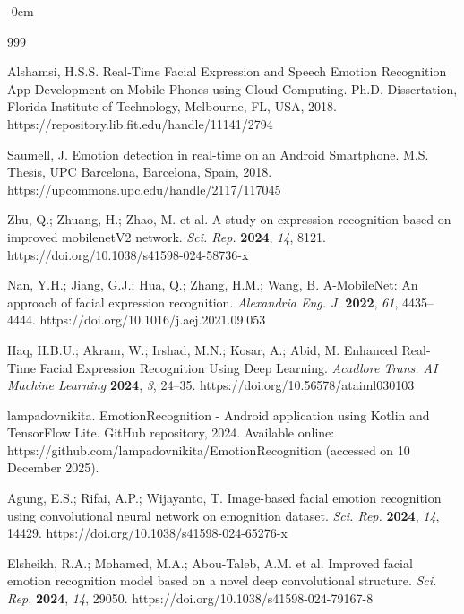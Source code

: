 \documentclass[journal,article,submit,pdftex,moreauthors]{Definitions/mdpi}
\begin{document}
\begin{adjustwidth}{-\extralength}{0cm}
	
	
	\begin{thebibliography}{999}
		
		Alshamsi, H.S.S. Real-Time Facial Expression and Speech Emotion Recognition App Development on Mobile Phones using Cloud Computing. Ph.D. Dissertation, Florida Institute of Technology, Melbourne, FL, USA, 2018. https://repository.lib.fit.edu/handle/11141/2794
		
		Saumell, J. Emotion detection in real-time on an Android Smartphone. M.S. Thesis, UPC Barcelona, Barcelona, Spain, 2018. https://upcommons.upc.edu/handle/2117/117045
		
		Zhu, Q.; Zhuang, H.; Zhao, M. et al. A study on expression recognition based on improved mobilenetV2 network. {\em Sci. Rep.} {\bf 2024}, {\em 14}, 8121. https://doi.org/10.1038/s41598-024-58736-x
		
		Nan, Y.H.; Jiang, G.J.; Hua, Q.; Zhang, H.M.; Wang, B. A-MobileNet: An approach of facial expression recognition. {\em Alexandria Eng. J.} {\bf 2022}, {\em 61}, 4435--4444. https://doi.org/10.1016/j.aej.2021.09.053
		
		Haq, H.B.U.; Akram, W.; Irshad, M.N.; Kosar, A.; Abid, M. Enhanced Real-Time Facial Expression Recognition Using Deep Learning. {\em Acadlore Trans. AI Machine Learning} {\bf 2024}, {\em 3}, 24--35. https://doi.org/10.56578/ataiml030103
		
		lampadovnikita. EmotionRecognition - Android application using Kotlin and TensorFlow Lite. GitHub repository, 2024. Available online: https://github.com/lampadovnikita/EmotionRecognition (accessed on 10 December 2025).
		
		Agung, E.S.; Rifai, A.P.; Wijayanto, T. Image-based facial emotion recognition using convolutional neural network on emognition dataset. {\em Sci. Rep.} {\bf 2024}, {\em 14}, 14429. https://doi.org/10.1038/s41598-024-65276-x
		
		Elsheikh, R.A.; Mohamed, M.A.; Abou-Taleb, A.M. et al. Improved facial emotion recognition model based on a novel deep convolutional structure. {\em Sci. Rep.} {\bf 2024}, {\em 14}, 29050. https://doi.org/10.1038/s41598-024-79167-8
		

\end{thebibliography}
\end{adjustwidth}
\end{document}
